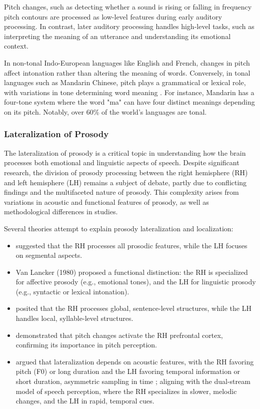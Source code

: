 Pitch changes, such as detecting whether a sound is rising or falling in frequency pitch contours are processed as low-level features during early auditory processing. In contrast, later auditory processing handles high-level tasks, such as interpreting the meaning of an utterance and understanding its emotional context.

In non-tonal Indo-European languages like English and French, changes in pitch affect intonation rather than altering the meaning of words. Conversely, in tonal languages such as Mandarin Chinese, pitch plays a grammatical or lexical role, with variations in tone determining word meaning \cite{howie_acoustical_1976}. For instance, Mandarin has a four-tone system where the word "ma" can have four distinct meanings depending on its pitch. Notably, over 60\% of the world's languages are tonal.

\subsubsection{Lateralization of Prosody}
The lateralization of prosody is a critical topic in understanding how the brain processes both emotional and linguistic aspects of speech. Despite significant research, the division of prosody processing between the right hemisphere (RH) and left hemisphere (LH) remains a subject of debate, partly due to conflicting findings and the multifaceted nature of prosody. This complexity arises from variations in acoustic and functional features of prosody, as well as methodological differences in studies.

Several theories attempt to explain prosody lateralization and localization:
\begin{itemize}
\item \cite{blumstein_hemispheric_1974} suggested that the RH processes all prosodic features, while the LH focuses on segmental aspects.
\item Van Lancker (1980) \cite{noauthor_cerebral_nodate} proposed a functional distinction: the RH is specialized for affective prosody (e.g., emotional tones), and the LH for linguistic prosody (e.g., syntactic or lexical intonation).
\item \cite{behrens_characterizing_1989} posited that the RH processes global, sentence-level structures, while the LH handles local, syllable-level structures.
\item \cite{zatorre_lateralization_1992} demonstrated that pitch changes activate the RH prefrontal cortex, confirming its importance in pitch perception.
\item \cite{van_lancker_identification_1992} argued that lateralization depends on acoustic features, with the RH favoring pitch (F0) or long duration and the LH favoring temporal information or short duration, asymmetric sampling in time ; aligning with the dual-stream model of speech perception, where the RH specializes in slower, melodic changes, and the LH in rapid, temporal cues.\cite{zatorre_structure_2002}

\end{itemize}

